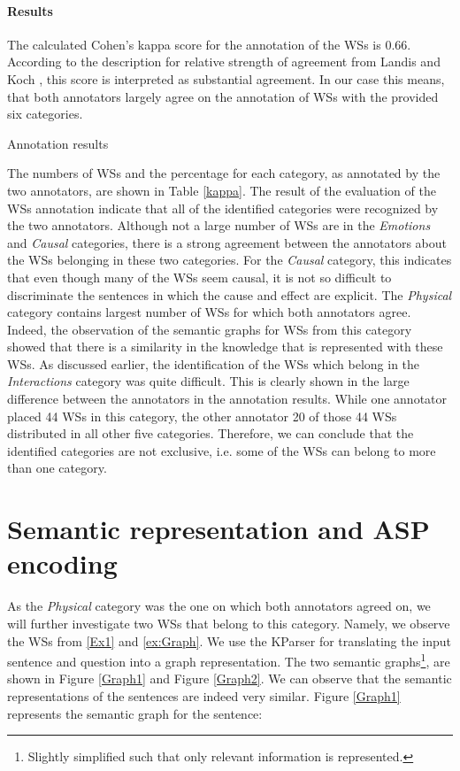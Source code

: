 \paragraph{Results}
The calculated Cohen's kappa score for the annotation of the WSs is 0.66. According to the description for relative strength of agreement from Landis and Koch \cite{articleM}, this score is interpreted as substantial agreement. In our case this means, that both annotators largely agree on the annotation of WSs with the provided six categories.

\begin{table}[h!]
	\centering
	
	\caption{{\label{kappa}}Annotation results}
\end{table}

The numbers of WSs  and the percentage for each category, as annotated by the two annotators, are shown in Table \ref{kappa}. The result of the evaluation of the WSs annotation indicate that all of the identified categories were recognized by the two annotators. Although not a large number of WSs are in the \textit{Emotions} and \textit{Causal} categories, there is a strong agreement between the annotators about the WSs belonging in these two categories. For the \textit{Causal} category, this indicates that even though many of the WSs seem causal, it is not so difficult to discriminate the sentences in which the cause and effect are explicit. The \textit{Physical} category contains largest number of WSs for which both annotators agree. Indeed, the observation of the semantic graphs for WSs from this category showed that there is a similarity in the knowledge that is represented with these WSs. As discussed earlier, the identification of the WSs which belong in the \textit{Interactions} category was quite difficult. This is clearly shown in the large difference between the annotators in the annotation results. While one annotator placed 44 WSs in this category, the other annotator 20 of those 44 WSs distributed in all other five categories. Therefore, we can conclude that the identified categories are not exclusive, i.e. some of the WSs can belong to more than one category. 



\section{Semantic representation and ASP encoding}
As the \textit{Physical} category was the one on which both annotators agreed on, we will further investigate two WSs that belong to this category. Namely, we observe the WSs from \ref{Ex1} and \ref{ex:Graph}. 
We use the KParser for translating the input sentence and question into a graph representation.
The two semantic graphs\footnote{Slightly simplified such that only relevant information is represented.}, are shown in Figure \ref{Graph1} and Figure \ref{Graph2}. We can observe that the semantic representations of the sentences are indeed very similar. 
Figure \ref{Graph1} represents the semantic graph for the sentence:

